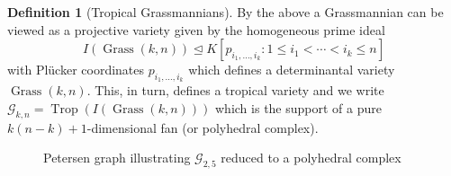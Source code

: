 \documentclass[
  paper=a4,
  titlepage,
  bibliography=totoc,
  pagesize=pdftex
]{scrartcl}
\numberwithin{figure}{section}
\numberwithin{equation}{section}
\numberwithin{table}{section}
\let\idealof\trianglelefteq
\DeclareMathOperator{\Trop}{Trop}
\DeclareMathOperator{\Grass}{Grass}
\theoremstyle{definition}
\newtheorem{definition}{Definition}
\numberwithin{definition}{section}
\begin{document}
\begin{definition}[Tropical Grassmannians]
  By the above a Grassmannian can be viewed as a projective variety given by the
  homogeneous prime ideal
  \[
    I(\Grass(k,n)) \idealof K[ p_{i_1, \dots, i_k} : 1\leq i_1 < \cdots < i_k \leq n ]
  \]
  with Plücker coordinates $p_{i_1,\dots,i_k}$ which defines a determinantal variety
  $\Grass(k, n)$. This, in turn, defines a tropical variety and we write $\mathcal G_{k,n}
  = \Trop(I(\Grass(k,n)))$ which is the support of a pure $k(n-k)+1$-dimensional fan (or
  polyhedral complex).
\end{definition}

\begin{figure}[tbhp]
  \centering
  \caption{Petersen graph illustrating $\mathcal G_{2,5}$ reduced to a polyhedral complex}
  \label{fig:petersen}
\end{figure}
\end{document}
